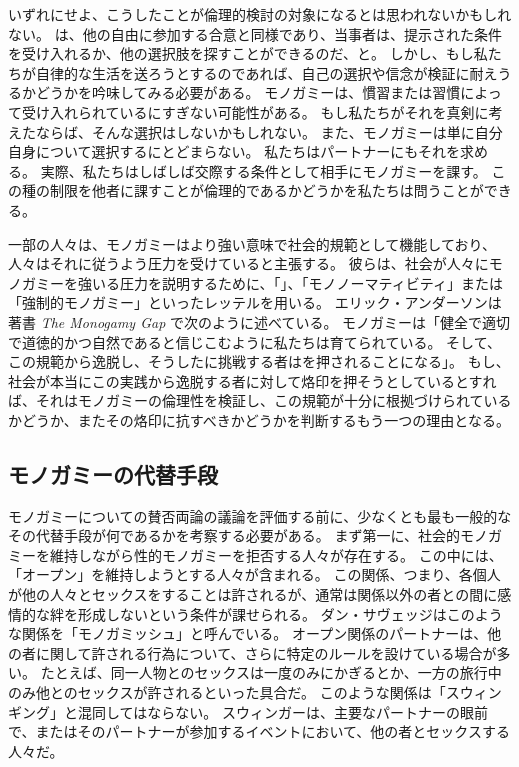 \documentclass[paper=a4,book,openany]{jlreq}
\newcommand{\ig}[1]{}           %
\begin{document}
いずれにせよ、こうしたことが倫理的検討の対象になるとは思われないかもしれない。
は、他の自由に参加する合意と同様であり、当事者は、提示された条件を受け入れるか、他の選択肢を探すことができるのだ、と。
しかし、もし私たちが自律的な生活を送ろうとするのであれば、自己の選択や信念が検証に耐えうるかどうかを吟味してみる必要がある。
モノガミーは、慣習または習慣によって受け入れられているにすぎない可能性がある。
もし私たちがそれを真剣に考えたならば、そんな選択はしないかもしれない。
また、モノガミーは単に自分自身について選択するにとどまらない。
私たちはパートナーにもそれを求める。
実際、私たちはしばしば交際する条件として相手にモノガミーを課す。
この種の制限を他者に課すことが倫理的であるかどうかを私たちは問うことができる。

一部の人々は、モノガミーはより強い意味で社会的規範として機能しており、人々はそれに従うよう圧力を受けていると主張する。
彼らは、社会が人々にモノガミーを強いる圧力を説明するために、「」、「モノノーマティビティ」または「強制的モノガミー」といったレッテルを用いる\citep[p.277]{emens04:_monog_law}。
エリック・アンダーソン\ig{Eric Anderson}は著書 \emph{The Monogamy Gap} で次のように述べている。
モノガミーは「健全で適切で道徳的かつ自然であると信じこむように私たちは育てられている。
そして、この規範から逸脱し、そうしたに挑戦する者はを押されることになる」\citep{anderson11:_monog_gap}。
もし、社会が本当にこの実践から逸脱する者に対して烙印を押そうとしているとすれば、それはモノガミーの倫理性を検証し、この規範が十分に根拠づけられているかどうか、またその烙印に抗すべきかどうかを判断するもう一つの理由となる。

\subsection{モノガミーの代替手段}

モノガミーについての賛否両論の議論を評価する前に、少なくとも最も一般的なその代替手段が何であるかを考察する必要がある。
まず第一に、社会的モノガミーを維持しながら性的モノガミーを拒否する人々が存在する。
この中には、「オープン」を維持しようとする人々が含まれる。
この関係、つまり、各個人が他の人々とセックスをすることは許されるが、通常は関係以外の者との間に感情的な絆を形成しないという条件が課せられる。
ダン・サヴェッジはこのような関係を「モノガミッシュ」と呼んでいる\citep{savage12:_savag_monogamish}。
オープン関係のパートナーは、他の者に関して許される行為について、さらに特定のルールを設けている場合が多い。
たとえば、同一人物とのセックスは一度のみにかぎるとか、一方の旅行中のみ他とのセックスが許されるといった具合だ。
このような関係は「スウィンギング」と混同してはならない。
スウィンガーは、主要なパートナーの眼前で、またはそのパートナーが参加するイベントにおいて、他の者とセックスする人々だ。
\end{document}
